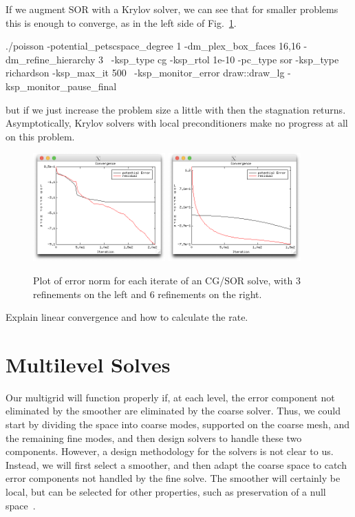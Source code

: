 \begin{refsection}
If we augment SOR with a Krylov solver, we can see that for smaller problems this is enough to converge, as in the left side of Fig.~\ref{fig:errorCGSOR}.
\begin{bash}
  ./poisson -potential_petscspace_degree 1 -dm_plex_box_faces 16,16 -dm_refine_hierarchy 3 \
    -ksp_type cg -ksp_rtol 1e-10 -pc_type sor -ksp_type richardson -ksp_max_it 500 \
    -ksp_monitor_error draw::draw_lg -ksp_monitor_pause_final
\end{bash}
but if we just increase the problem size a little with  then the stagnation returns. Asymptotically, Krylov solvers with local preconditioners make no progress at all on this problem.

\begin{figure}
\centering
\includegraphics[width=2in]{figures/errorCGSORLG_r3.png}\hfil
\includegraphics[width=2in]{figures/errorCGSORLG_r6.png}
\caption{Plot of error norm for each iterate of an CG/SOR solve, with 3 refinements on the left and 6 refinements on the right.\label{fig:errorCGSOR}}
\end{figure}

Explain linear convergence and how to calculate the rate.

\section{Multilevel Solves}

Our multigrid will function properly if, at each level, the error component not eliminated by the smoother are eliminated by the coarse solver. Thus, we could start by dividing the space into coarse modes, supported on the coarse mesh, and the remaining fine modes, and then design solvers to handle these two components. However, a design methodology for the solvers is not clear to us. Instead, we will first select a smoother, and then adapt the coarse space to catch error components not handled by the fine solve. The smoother will certainly be local, but can be selected for other properties, such as preservation of a null space~\parencite{FarrellMitchellWechsung2018,FarrellKnepleyWechsungMitchell2020}.


\end{refsection}
